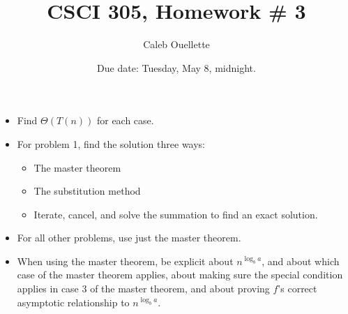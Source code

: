 \documentclass{article}
\title{CSCI 305, Homework \# 3}
\author{Caleb Ouellette}
\date{Due date:  Tuesday, May 8, midnight.}
\begin{document}
    
    \maketitle
    
    \begin{itemize}
      \item
    Find $\Theta(T(n))$ for each case.
    \item
    For problem 1, find the solution three ways:
    \begin{itemize}
    \item The master theorem
    \item The substitution method
    \item Iterate, cancel, and solve the summation
      to find an exact solution.
    \end{itemize}
    \item
    For all other problems, use just the master theorem.
    \item
    When using the master theorem, be explicit about $n^{\log_b a}$,
    and about which case of the master theorem applies,
    about making sure the special condition applies in case 3
    of the master theorem, and
    about proving $f$'s correct
    asymptotic relationship to $n^{\log_b a}$.
    \end{itemize}
    
\end{document}
